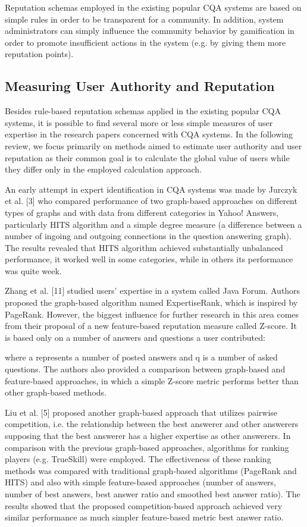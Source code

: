 \documentclass{llncs}
\begin{document}
			Reputation schemas employed in the existing popular CQA systems are based
			on simple rules in order to be transparent for a community. In addition, system
			administrators can simply influence the community behavior by gamification in
			order to promote insufficient actions in the system (e.g. by giving them more
			reputation points).

			
		\subsection{Measuring User Authority and 	Reputation}
			Besides rule-based reputation schemas applied in the existing popular CQA systems,
			it is possible to find several more or less simple measures of user expertise
			in the research papers concerned with CQA systems. In the following review,
			we focus primarily on methods aimed to estimate user authority and user reputation
			as their common goal is to calculate the global value of users while they
			differ only in the employed calculation approach.
			
			An early attempt in expert identification in CQA systems was made by Jurczyk
			et al. [3] who compared performance of two graph-based approaches on
			different types of graphs and with data from different categories in Yahoo! Answers,
			particularly HITS algorithm and a simple degree measure (a difference
			between a number of ingoing and outgoing connections in the question answering
			graph). The results revealed that HITS algorithm achieved substantially
			unbalanced performance, it worked well in some categories, while in others its
			performance was quite week.
			
			Zhang et al. [11] studied users’ expertise in a system called Java Forum.
			Authors proposed the graph-based algorithm named ExpertiseRank, which is
			inspired by PageRank. However, the biggest influence for further research in
			this area comes from their proposal of a new feature-based reputation measure
			called Z-score. It is based only on a number of answers and questions a user
			contributed:



			where a represents a number of posted answers and q is a number of asked
			questions. The authors also provided a comparison between graph-based and
			feature-based approaches, in which a simple Z-score metric performs better than 
			other graph-based methods.	
		
			Liu et al. [5] proposed another graph-based approach that utilizes pairwise
			competition, i.e. the relationship between the best answerer and other answerers
			supposing that the best answerer has a higher expertise as other answerers.
			In comparison with the previous graph-based approaches, algorithms for ranking
			players (e.g. TrueSkill) were employed. The effectiveness of these ranking
			methods was compared with traditional graph-based algorithms (PageRank and
			HITS) and also with simple feature-based approaches (number of answers, number
			of best answers, best answer ratio and smoothed best answer ratio). The
			results showed that the proposed competition-based approach achieved very similar
			performance as much simpler feature-based metric best answer ratio.
\end{document}
